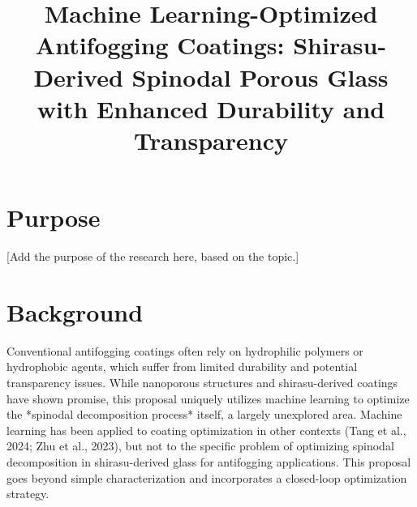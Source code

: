 \documentclass{article}
\title{Machine Learning-Optimized Antifogging Coatings: Shirasu-Derived Spinodal Porous Glass with Enhanced Durability and Transparency}
\author{}
\date{}
\begin{document}
\maketitle
\section{Purpose}
[Add the purpose of the research here, based on the topic.]

\section{Background}
Conventional antifogging coatings often rely on hydrophilic polymers or hydrophobic agents, which suffer from limited durability and potential transparency issues. While nanoporous structures and shirasu-derived coatings have shown promise, this proposal uniquely utilizes machine learning to optimize the *spinodal decomposition process* itself, a largely unexplored area. Machine learning has been applied to coating optimization in other contexts (Tang et al., 2024; Zhu et al., 2023), but not to the specific problem of optimizing spinodal decomposition in shirasu-derived glass for antifogging applications. This proposal goes beyond simple characterization and incorporates a closed-loop optimization strategy.
\end{document}
